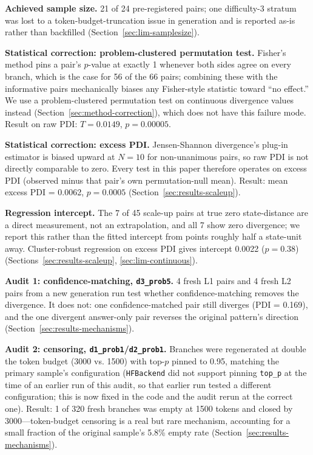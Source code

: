 \documentclass{article}
\begin{document}
\textbf{Achieved sample size.} 21 of 24 pre-registered pairs; one difficulty-3 stratum was lost to a token-budget-truncation issue in generation and is reported as-is rather than backfilled (Section~\ref{sec:lim-samplesize}).

\textbf{Statistical correction: problem-clustered permutation test.} Fisher's method pins a pair's $p$-value at exactly 1 whenever both sides agree on every branch, which is the case for 56 of the 66 pairs; combining these with the informative pairs mechanically biases any Fisher-style statistic toward ``no effect.'' We use a problem-clustered permutation test on continuous divergence values instead (Section~\ref{sec:method-correction}), which does not have this failure mode. Result on raw PDI: $T = 0.0149$, $p = 0.00005$.

\textbf{Statistical correction: excess PDI.} Jensen-Shannon divergence's plug-in estimator is biased upward at $N=10$ for non-unanimous pairs, so raw PDI is not directly comparable to zero. Every test in this paper therefore operates on excess PDI (observed minus that pair's own permutation-null mean). Result: mean excess PDI = 0.0062, $p = 0.0005$ (Section~\ref{sec:results-scaleup}).

\textbf{Regression intercept.} The 7 of 45 scale-up pairs at true zero state-distance are a direct measurement, not an extrapolation, and all 7 show zero divergence; we report this rather than the fitted intercept from points roughly half a state-unit away. Cluster-robust regression on excess PDI gives intercept 0.0022 ($p = 0.38$) (Sections~\ref{sec:results-scaleup}, \ref{sec:lim-continuous}).

\textbf{Audit 1: confidence-matching, \texttt{d3\_prob5}.} 4 fresh L1 pairs and 4 fresh L2 pairs from a new generation run test whether confidence-matching removes the divergence. It does not: one confidence-matched pair still diverges (PDI = 0.169), and the one divergent answer-only pair reverses the original pattern's direction (Section~\ref{sec:results-mechanisms}).

\textbf{Audit 2: censoring, \texttt{d1\_prob1}/\texttt{d2\_prob1}.} Branches were regenerated at double the token budget (3000 vs. 1500) with top-$p$ pinned to 0.95, matching the primary sample's configuration (\texttt{HFBackend} did not support pinning \texttt{top\_p} at the time of an earlier run of this audit, so that earlier run tested a different configuration; this is now fixed in the code and the audit rerun at the correct one). Result: 1 of 320 fresh branches was empty at 1500 tokens and closed by 3000---token-budget censoring is a real but rare mechanism, accounting for a small fraction of the original sample's 5.8\% empty rate (Section~\ref{sec:results-mechanisms}).
\end{document}
